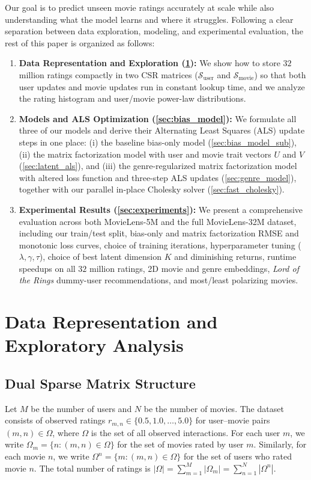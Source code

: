 \documentclass{article}
\theoremstyle{plain}
\theoremstyle{definition}
\begin{document}
Our goal is to predict unseen movie ratings accurately at scale while also understanding what the model learns and where it struggles. Following a clear separation between data exploration, modeling, and experimental evaluation, the rest of this paper is organized as follows:
\begin{enumerate}
    \item \textbf{Data Representation and Exploration (\cref{sec:data_topology}):} We show how to store $32$ million ratings compactly in two CSR matrices ($\mathcal{S}_{\text{user}}$ and $\mathcal{S}_{\text{movie}}$) so that both user updates and movie updates run in constant lookup time, and we analyze the rating histogram and user/movie power-law distributions.
    \item \textbf{Models and ALS Optimization (\cref{sec:bias_model}):} We formulate all three of our models and derive their Alternating Least Squares (ALS) update steps in one place: (i) the baseline bias-only model (\cref{sec:bias_model_sub}), (ii) the matrix factorization model with user and movie trait vectors $U$ and $V$ (\cref{sec:latent_als}), and (iii) the genre-regularized matrix factorization model with altered loss function and three-step ALS updates (\cref{sec:genre_model}), together with our parallel in-place Cholesky solver (\cref{sec:fast_cholesky}).
    \item \textbf{Experimental Results (\cref{sec:experiments}):} We present a comprehensive evaluation across both MovieLens-5M and the full MovieLens-32M dataset, including our train/test split, bias-only and matrix factorization RMSE and monotonic loss curves, choice of training iterations, hyperparameter tuning ($\lambda, \gamma, \tau$), choice of best latent dimension $K$ and diminishing returns, runtime speedups on all $32$ million ratings, 2D movie and genre embeddings, \emph{Lord of the Rings} dummy-user recommendations, and most/least polarizing movies.
\end{enumerate}

\section{Data Representation and Exploratory Analysis}
\label{sec:data_topology}

\subsection{Dual Sparse Matrix Structure}
Let $M$ be the number of users and $N$ be the number of movies. The dataset consists of observed ratings $r_{m,n} \in \{0.5, 1.0, \dots, 5.0\}$ for user--movie pairs $(m,n) \in \Omega$, where $\Omega$ is the set of all observed interactions. For each user $m$, we write $\Omega_m = \{n : (m,n) \in \Omega\}$ for the set of movies rated by user $m$. Similarly, for each movie $n$, we write $\Omega^n = \{m : (m,n) \in \Omega\}$ for the set of users who rated movie $n$. The total number of ratings is $|\Omega| = \sum_{m=1}^M |\Omega_m| = \sum_{n=1}^N |\Omega^n|$.
\end{document}

